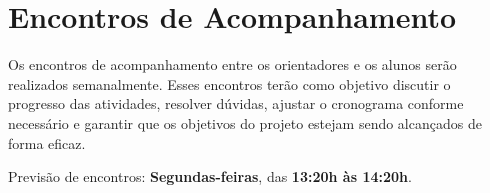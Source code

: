 \section{Encontros de Acompanhamento}

Os encontros de acompanhamento entre os orientadores e os alunos serão realizados semanalmente. Esses encontros terão como objetivo discutir o progresso das atividades, resolver dúvidas, ajustar o cronograma conforme necessário e garantir que os objetivos do projeto estejam sendo alcançados de forma eficaz.

Previsão de encontros:
\textbf{Segundas-feiras}, das \textbf{13:20h às 14:20h}.